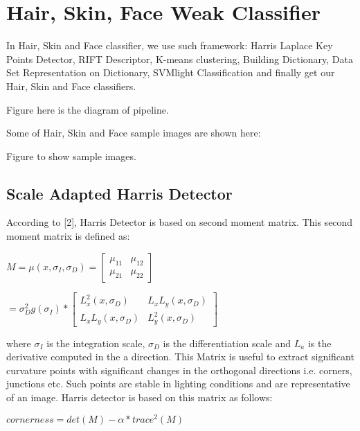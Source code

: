 \documentclass[10pt,twocolumn,letterpaper]{article}
\begin{document}
\section{Hair, Skin, Face Weak Classifier}
In Hair, Skin and Face classifier, we use such framework: Harris Laplace Key Points Detector, RIFT Descriptor, K-means clustering, Building Dictionary, Data Set Representation on Dictionary, SVMlight Classification and finally get our Hair, Skin and Face classifiers.  

Figure here is the diagram of pipeline.

Some of Hair, Skin and Face sample images are shown here:

Figure to show sample images.

\subsection{Scale Adapted Harris Detector}
According to [2], Harris Detector is based on second moment matrix. This second moment matrix is defined as:

$M=\mu(x, \sigma_{I}, \sigma_{D})=[\begin{array}{cc}
                                     \mu_{11} & \mu_{12} \\
                                     \mu_{21} & \mu_{22}
                                   \end{array}]$

$=\sigma_{D}^{2}g(\sigma_{I})*[\begin{array}{cc}
                                L_{x}^{2}(x, \sigma_{D}) & L_{x}L_{y}(x, \sigma_{D}) \\
                                L_{x}L_{y}(x, \sigma_{D}) & L_{y}^{2}(x, \sigma_{D})
                              \end{array}]$

where $\sigma_{I}$ is the integration scale, $\sigma_{D}$ is the differentiation scale and $L_{a}$ is the derivative computed in the a direction.
This Matrix is useful to extract significant curvature points with significant changes in the orthogonal directions i.e. corners, junctions etc.
Such points are stable in lighting conditions and are representative of an image. Harris detector is based on this matrix as follows:

$cornerness=det(M)-\alpha*trace^{2}(M)$
\end{document}
